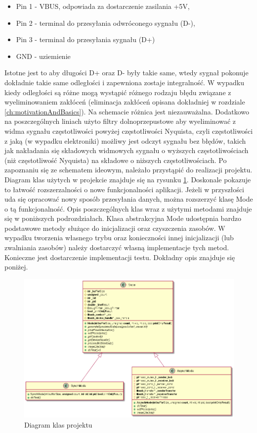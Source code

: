 \documentclass{BscUS}
\begin{document}
\begin{itemize}
\item Pin 1 - VBUS, odpowiada za dostarczenie zasilania +5V,
\item Pin 2 - terminal do przesyłania odwróconego sygnału (D-),
\item Pin 3 - terminal do przesyłania sygnału (D+)
\item GND - uziemienie
\end{itemize}
\noindent Istotne jest to aby długości D+ oraz D- były takie same, wtedy sygnał pokonuje dokładnie takie same odległości i zapewniona zostaje integralność. W wypadku kiedy odległości są różne mogą wystąpić różnego rodzaju błędu związane z wyeliminowaniem zakłóceń (eliminacja zakłóceń opisana dokładniej w rozdziale \ref{ch:motivationAndBasics}). Na schemacie różnica jest niezauważalna. Dodatkowo na poszczególnych liniach użyto filtry dolnoprzepustowe aby wyeliminować z widma sygnału częstotliwości powyżej częstotliwości Nyquista, czyli częstotliwości z jaką (w wypadku elektroniki) możliwy jest odczyt sygnału bez błędów, takich jak nakładania się składowych widmowych sygnału o wyższych częstotliwościach (niż częstotliwość Nyquista) na składowe o niższych częstotliwościach.
\newline
\indent Po zapoznaniu się ze schematem ideowym, należało przystąpić do realizacji projektu. Diagram klas użytych w projekcie znajduje się na rysunku \ref{fig:classDiagram}. Doskonale pokazuje to łatwość rozszerzalności o nowe funkcjonalności aplikacji. Jeżeli w przyszłości uda się opracować nowy sposób przesyłania danych, można rozszerzyć klasę Mode o tą funkcjonalność. Opis poszczególnych klas wraz z użytymi metodami znajduje się w poniższych podrozdziałach. Klasa abstrakcyjna Mode udostępnia bardzo podstawowe metody służące do inicjalizacji oraz czyszczenia zasobów. W wypadku tworzenia własnego trybu oraz konieczności innej inicjalizacji (lub zwalniania zasobów) należy dostarczyć własną implementacje tych metod. Konieczne jest dostarczenie implementacji testu. Dokładny opis znajduje się poniżej.
\begin{figure}[H]
\centering
\includegraphics[width=1\textwidth]{./img/classDiagram}
\caption{Diagram klas projektu}
\label{fig:classDiagram}
\end{figure}
\end{document}
